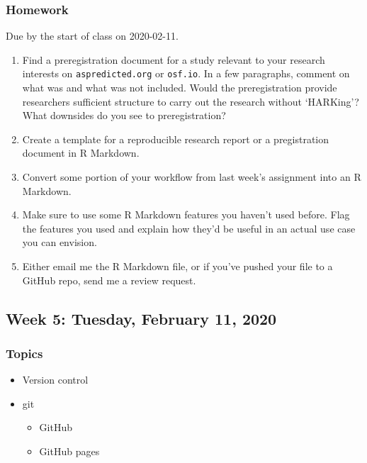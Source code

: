 \documentclass[
]{article}
\providecommand{\tightlist}{%
  \setlength{\itemsep}{0pt}\setlength{\parskip}{0pt}}
\begin{document}
\hypertarget{homework-3}{%
\subsubsection{Homework}\label{homework-3}}

Due by the start of class on 2020-02-11.

\begin{enumerate}
\def\labelenumi{\arabic{enumi}.}
\tightlist
\item
  Find a preregistration document for a study relevant to your research
  interests on \texttt{aspredicted.org} or \texttt{osf.io}. In a few
  paragraphs, comment on what was and what was not included. Would the
  preregistration provide researchers sufficient structure to carry out
  the research without `HARKing'? What downsides do you see to
  preregistration?
\item
  Create a template for a reproducible research report or a
  pregistration document in R Markdown.
\item
  Convert some portion of your workflow from last week's assignment into
  an R Markdown.
\item
  Make sure to use some R Markdown features you haven't used before.
  Flag the features you used and explain how they'd be useful in an
  actual use case you can envision.
\item
  Either email me the R Markdown file, or if you've pushed your file to
  a GitHub repo, send me a review request.
\end{enumerate}

\hypertarget{week-5-tuesday-february-11-2020}{%
\subsection{Week 5: Tuesday, February 11,
2020}\label{week-5-tuesday-february-11-2020}}

\hypertarget{topics-4}{%
\subsubsection{Topics}\label{topics-4}}

\begin{itemize}
\tightlist
\item
  Version control
\item
  git

  \begin{itemize}
  \tightlist
  \item
    GitHub
  \item
    GitHub pages
  \end{itemize}
\end{itemize}
\end{document}
